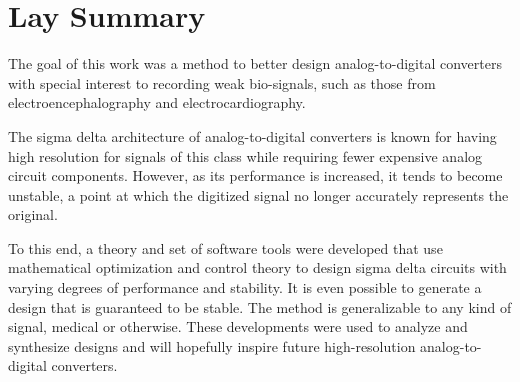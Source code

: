 

\chapter{Lay Summary}

The goal of this work was a method to better design analog-to-digital converters with special interest to recording weak bio-signals, such as those from electroencephalography and electrocardiography.

The sigma delta architecture of analog-to-digital converters is known for having high resolution for signals of this class while requiring fewer expensive analog circuit components. However, as its performance is increased, it tends to become unstable, a point at which the digitized signal no longer accurately represents the original.

To this end, a theory and set of software tools were developed that use mathematical optimization and control theory to design sigma delta circuits with varying degrees of performance and stability. It is even possible to generate a design that is guaranteed to be stable. The method is generalizable to any kind of signal, medical or otherwise. These developments were used to analyze and synthesize designs and will hopefully inspire future high-resolution analog-to-digital converters.
